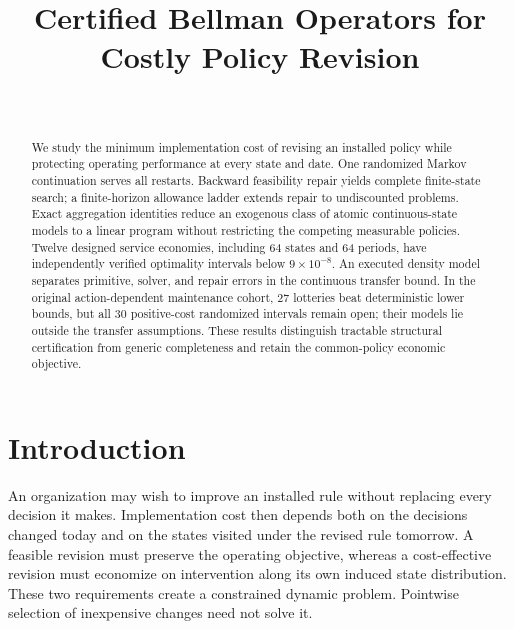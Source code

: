 


\begin{frontmatter}
\title{Certified Bellman Operators for Costly Policy Revision}
\begin{aug}\author[id=au1,addressref={add1}]{~}\address[id=add1]{}\end{aug}
\begin{abstract}
We study the minimum implementation cost of revising an installed policy while protecting operating performance at every state and date. One randomized Markov continuation serves all restarts. Backward feasibility repair yields complete finite-state search; a finite-horizon allowance ladder extends repair to undiscounted problems. Exact aggregation identities reduce an exogenous class of atomic continuous-state models to a linear program without restricting the competing measurable policies. Twelve designed service economies, including 64 states and 64 periods, have independently verified optimality intervals below $9\times10^{-8}$. An executed density model separates primitive, solver, and repair errors in the continuous transfer bound. In the original action-dependent maintenance cohort, 27 lotteries beat deterministic lower bounds, but all 30 positive-cost randomized intervals remain open; their models lie outside the transfer assumptions. These results distinguish tractable structural certification from generic completeness and retain the common-policy economic objective.
\end{abstract}
\begin{keyword}\end{keyword}
\end{frontmatter}

\section{Introduction}\label{sec:introduction}
An organization may wish to improve an installed rule without replacing every decision it makes. Implementation cost then depends both on the decisions changed today and on the states visited under the revised rule tomorrow. A feasible revision must preserve the operating objective, whereas a cost-effective revision must economize on intervention along its own induced state distribution. These two requirements create a constrained dynamic problem. Pointwise selection of inexpensive changes need not solve it.

